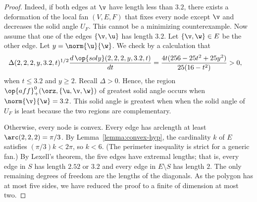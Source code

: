 \begin{proof}
  Indeed,%
 if both edges at $\v$ have length less than $3.2$, there
exists a deformation of the local fan $(V,E,F)$ that fixes every node
except $\v$ and decreases the solid angle $U_F$.  This cannot be a
minimizing counterexample.  Now assume that one of the edges
$\{\v,\u\}$ has length $3.2$.  Let $\{\v,\w\}\in E$ be the other edge.
Let
$y=\norm{\u}{\w}$.  We check by a  calculation that
\begin{align*}
\Delta(2,2,2,y,3.2,t)^{1/2}\dfrac{d\,\op{soly}(2,2,2,y,3.2,t)}{dt} &= 
\dfrac{4t(256 - 25t^2 + 25y^2)}{25(16 - t^2)} >0,
\end{align*}
when $t\le3.2$ and $y\ge 2$.  Recall  $\Delta>0$.
Hence, the region
$\op{aff}^0_+(\orz,\{\u,\v,\w\})$ of greatest
solid angle occurs when $\norm{\v}{\w}=3.2$.  This solid angle is greatest when
when the solid angle of $U_F$ is least because  the two regions are complementary.


  Otherwise,
every node is convex.  Every edge has arclength at least
$\arc(2,2,2)=\pi/3$.  By Lemma~\ref{lemma:convex-hyp}, the cardinality
$k$ of $E$ satisfies $(\pi/3)k < 2\pi$, so $k<6$.  (The perimeter inequality is
strict for a generic fan.)  By Lexell's theorem, the five edges have
extremal lengths;  that is, every edge in $S$ has length $2.52$ or
$3.2$ and every edge in $E\setminus S$ has length $2$.  The only
remaining degrees of freedom are the lengths of the diagonals.  As the
polygon has at most five sides, we have reduced the proof  to a
finite  of dimension at
most two.



\end{proof}
